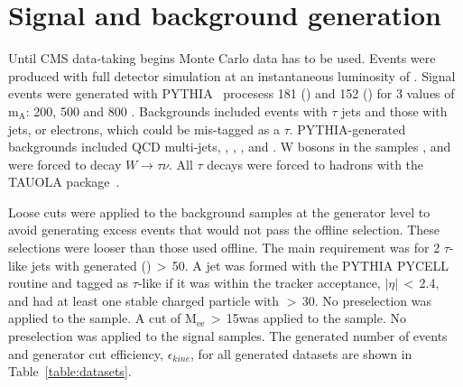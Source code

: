 \section{Signal and background generation}
Until CMS data-taking begins Monte Carlo data has to be used. Events were produced with full detector simulation at an instantaneous luminosity of \lowlumi. Signal events were generated with PYTHIA~\cite{citeulike:903853} procesess 181 (\bbH) and 152 (\ggH) for 3 values of $\mathrm{m_{A}}$: 200, 500 and 800 \GeVcc. Backgrounds included events with $\tau$ jets and those with jets, or electrons, which could be mis-tagged as a $\tau$. PYTHIA-generated backgrounds included QCD multi-jets, \ZTauTau, \Zee, \TopTop, \Wtb\xspace and \Wjet. W bosons in the samples \TopTop, \Wjet\xspace and \Wtb were forced to decay $W \rightarrow \tau\nu$. All $\tau$ decays were forced to hadrons with the TAUOLA package~\cite{citeulike:903857}.


Loose cuts were applied to the background samples at the generator level to avoid generating excess events that would not pass the offline selection. These selections were looser than those used offline. The main requirement was for 2 $\tau$-like jets with generated \PT (\pthat)\,$>$\,50\GeV. A jet was formed with the PYTHIA PYCELL routine and tagged as $\tau$-like if it was within the tracker acceptance, $|\eta|$\,$<$\,2.4, and had at least one stable charged particle with \PT$>$\,30\GeVc. No \PT preselection was applied to the \ZTauTau sample. A cut of $\mathrm{M_{ee}}$\,$>$\,15\GeVcc was applied to the \Zee sample. No preselection was applied to the signal samples. The generated number of events and generator cut efficiency, $\epsilon_{kine}$, for all generated datasets are shown in Table~\ref{table:datasets}.

